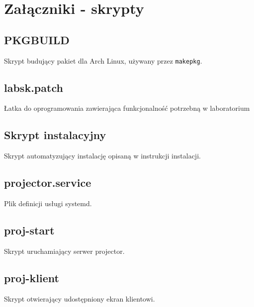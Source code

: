 \documentclass[a4paper,11pt]{article}
\begin{document}
    \section{Załączniki - skrypty}
        \subsection{PKGBUILD}
        Skrypt budujący pakiet dla Arch Linux, używany przez \texttt{makepkg}.
        \label{PKGBUILD}
        
        \subsection{labsk.patch}
        Łatka do oprogramowania zawierająca funkcjonalność potrzebną w laboratorium
        \label{labsk.patch}
        
        \subsection{Skrypt instalacyjny}
        \label{proj}
        Skrypt automatyzujący instalację opisaną w instrukcji instalacji.
        
        \subsection{projector.service}
        Plik definicji usługi systemd.
        \label{projector.service}
        
        \subsection{proj-start}
        Skrypt uruchamiający serwer projector.
        \label{proj-start}
        
        \subsection{proj-klient}
        Skrypt otwierający udostępniony ekran klientowi.
        \label{proj-klient}
        
\end{document}
